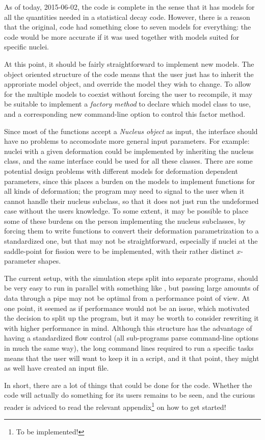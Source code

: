 As of today, 2015-06-02, the \codename{} code is complete in the sense that it has models for all the quantities needed in a statistical decay code.
However, there is a reason that the original,  code had something close to seven models for everything: the code would be more accurate if it was used together with models suited for specific nuclei.

At this point, it should be fairly straightforward to implement new models. The object oriented structure of the code means that the user just has to inherit the approriate model object, and override the model they wish to change. To allow for the multiple models to coexist without forcing the user to recompile, it may be suitable to implement a \emph{factory method} to declare which model class to use, and a corresponding new command-line option to control this factor method.

Since most of the functions accept a \emph{Nucleus object} as input, the interface should have no problems to accomodate more general input parameters. For example: nuclei with a given deformation could be implemented by inheriting the nucleus class, and the same interface could be used for all these classes. 
There are some potential design problems with different models for deformation dependent parameters, since this places a burden on the models to implement functions for all kinds of deformation; the program may need to signal to the user when it cannot handle their nucleus subclass, so that it does not just run the undeformed case without the users knowledge. To some extent, it may be possible to place some of these burdens on the person implementing the nucleus subclasses, by forcing them to write functions to convert their deformation parametrization to a standardized one, but that may not be straightforward, especially if nuclei at the saddle-point for fission were to be implemented, with their rather distinct $x$-parameter shapes.

The current setup, with the simulation steps split into separate programs, should be very easy to run in parallel with something like , but passing large amounts of data through a pipe may not be optimal from a performance point of view. At one point, it seemed as if performance would not be an issue, which motivated the decision to split up the program, but it may be worth to consider rewriting it with higher performance in mind. Although this structure has the advantage of having a standardized flow control (all sub-programs parse command-line options in much the same way), the long command lines required to run a specific tasks means that the user will want to keep it in a script, and it that point, they might as well have created an input file. 

In short, there are a lot of things that could be done for the code. 
Whether the code will actually do something for its users remains to be seen, and the curious reader is adviced to read the relevant appendix\footnote{To be implemented!} on how to get started!